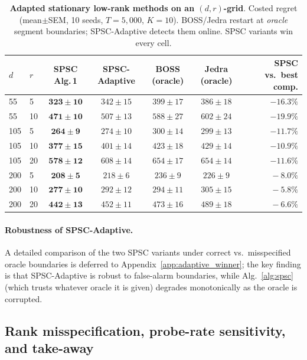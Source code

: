 \documentclass{article}
\begin{document}
\begin{table}[!htbp]
\centering
\caption{\textbf{Adapted stationary low-rank methods on an $(d,r)$-grid}.
Costed regret (mean$\pm$SEM, 10 seeds, $T{=}5{,}000$, $K{=}10$). BOSS/Jedra restart at \emph{oracle} segment boundaries;
SPSC-Adaptive detects them online. SPSC variants win every cell.}
\label{tab:boss_jedra_grid}
\small
\setlength{\tabcolsep}{4pt}
\begin{tabular}{ll cccc r}
\toprule
$d$ & $r$ & SPSC Alg.\,1 & SPSC-Adaptive & BOSS (oracle) & Jedra (oracle) & SPSC vs.\ best comp.\\
\midrule
55  & 5   & $\mathbf{323\pm10}$ & $342\pm15$         & $399\pm17$         & $386\pm18$         & $-16.3\%$ \\
55  & 10  & $\mathbf{471\pm10}$ & $507\pm13$         & $588\pm27$         & $602\pm24$         & $-19.9\%$ \\
105 & 5   & $\mathbf{264\pm 9}$ & $274\pm10$         & $300\pm14$         & $299\pm13$         & $-11.7\%$ \\
105 & 10  & $\mathbf{377\pm15}$ & $401\pm14$         & $423\pm18$         & $429\pm14$         & $-10.9\%$ \\
105 & 20  & $\mathbf{578\pm12}$ & $608\pm14$         & $654\pm17$         & $654\pm14$         & $-11.6\%$ \\
200 & 5   & $\mathbf{208\pm 5}$ & $218\pm 6$         & $236\pm 9$         & $226\pm 9$         & $\phantom{-}-8.0\%$ \\
200 & 10  & $\mathbf{277\pm10}$ & $292\pm12$         & $294\pm11$         & $305\pm15$         & $\phantom{-}-5.8\%$ \\
200 & 20  & $\mathbf{442\pm13}$ & $452\pm11$         & $473\pm16$         & $489\pm18$         & $\phantom{-}-6.6\%$ \\
\bottomrule
\end{tabular}
\end{table}

\paragraph{Robustness of SPSC-Adaptive.} A detailed comparison of the
two SPSC variants under correct vs.\ misspecified oracle boundaries
is deferred to Appendix~\ref{app:adaptive_winner}; the key finding is
that SPSC-Adaptive is robust to false-alarm boundaries, while
Alg.~\ref{alg:spsc} (which trusts whatever oracle it is given)
degrades monotonically as the oracle is corrupted.

\subsection{Rank misspecification, probe-rate sensitivity, and take-away}
\label{sec:exp_sensitivity}
\end{document}

